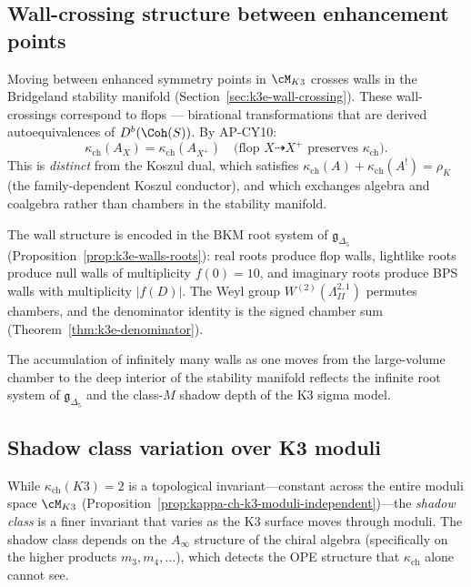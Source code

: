 \subsection{Wall-crossing structure between enhancement points}
\label{subsec:k3-enhancement-wall-crossing}

\begin{remark}
\label{rem:k3-wall-crossing-kappa}
Moving between enhanced symmetry points in $\cM_{K3}$ crosses walls
in the Bridgeland stability manifold
(Section~\ref{sec:k3e-wall-crossing}).  These wall-crossings
correspond to flops --- birational transformations that are
derived autoequivalences of $D^b(\Coh(S))$.  By AP-CY10:
\[
 \kappa_{\mathrm{ch}}(A_X) = \kappa_{\mathrm{ch}}(A_{X^+})
 \quad \text{(flop $X \dashrightarrow X^+$ preserves $\kappa_{\mathrm{ch}}$)}.
\]
This is \emph{distinct} from the Koszul dual, which satisfies
$\kappa_{\mathrm{ch}}(A) + \kappa_{\mathrm{ch}}(A^!) = \rho_K$
(the family-dependent Koszul conductor), and which exchanges
algebra and coalgebra rather than chambers in the stability manifold.

The wall structure is encoded in the BKM root system of
$\mathfrak{g}_{\Delta_5}$
(Proposition~\ref{prop:k3e-walls-roots}): real roots produce
flop walls, lightlike roots produce null walls of multiplicity
$f(0) = 10$, and imaginary roots produce BPS walls with
multiplicity $|f(D)|$.  The Weyl group $W^{(2)}(\Lambda^{2,1}_{II})$
permutes chambers, and the denominator identity is the signed
chamber sum (Theorem~\ref{thm:k3e-denominator}).

The accumulation of infinitely many walls as one moves from
the large-volume chamber to the deep interior of the stability
manifold reflects the infinite root system of $\mathfrak{g}_{\Delta_5}$
and the class-$M$ shadow depth of the K3 sigma model.
\end{remark}


\subsection{Shadow class variation over K3 moduli}
\label{subsec:shadow-class-moduli-variation}

While $\kappa_{\mathrm{ch}}(K3) = 2$ is a topological invariant---constant
across the entire moduli space $\cM_{K3}$
(Proposition~\ref{prop:kappa-ch-k3-moduli-independent})---the
\emph{shadow class} is a finer invariant that varies as the K3 surface
moves through moduli.  The shadow class depends on the $A_\infty$
structure of the chiral algebra (specifically on the higher products
$m_3, m_4, \dotsc$), which detects the OPE structure that
$\kappa_{\mathrm{ch}}$ alone cannot see.


